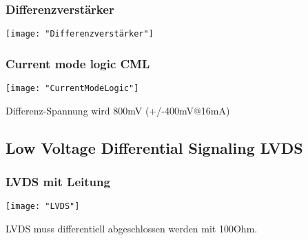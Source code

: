 \subsubsection{Differenzverstärker}
\begin{minipage}[t]{0.3\textwidth}
	\vspace{0pt}								%
	\texttt{[image: "Differenzverstärker"]}
\end{minipage}\hspace{0.05\textwidth}
\begin{minipage}[t]{0.65\textwidth}
	\vspace{0pt}								%
	
\end{minipage}
\vspace{2mm}


\subsubsection{Current mode logic CML}
\begin{minipage}[t]{0.3\textwidth}
	\vspace{0pt}								%
	\texttt{[image: "CurrentModeLogic"]}
\end{minipage}\hspace{0.05\textwidth}
\begin{minipage}[t]{0.65\textwidth}
	\vspace{0pt}								%
	Differenz-Spannung wird 800mV (+/-400mV@16mA)
\end{minipage}
\vspace{2mm}


\subsection{Low Voltage Differential Signaling LVDS}
\subsubsection{LVDS mit Leitung}
\begin{minipage}[t]{0.3\textwidth}
	\vspace{0pt}								%
	\texttt{[image: "LVDS"]}
\end{minipage}\hspace{0.05\textwidth}
\begin{minipage}[t]{0.65\textwidth}
	\vspace{0pt}								%
	LVDS muss differentiell abgeschlossen werden mit 100Ohm.
\end{minipage}
\vspace{2mm}

